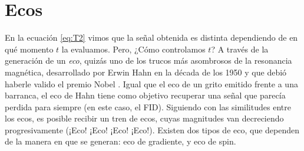 \section{Ecos}
En la ecuación \ref{eq:T2} vimos que la señal obtenida es distinta dependiendo de en qué momento $t$ la evaluamos. Pero, ¿Cómo controlamos $t$? A través de la generación de un \textit{eco}, quizás uno de los trucos más asombrosos de la resonancia magnética, desarrollado por Erwin Hahn en la década de los 1950 y que debió haberle valido el premio Nobel \citep{mansfield2013long}. Igual que el eco de un grito emitido frente a una barranca, el eco de Hahn tiene como objetivo recuperar una señal que parecía perdida para siempre (en este caso, el FID). Siguiendo con las similitudes entre los ecos, es posible recibir un tren de ecos, cuyas magnitudes van decreciendo progresivamente ({\Large ¡Eco!} {\normalsize ¡Eco!} {\small ¡Eco!} {\tiny ¡Eco!}). Existen dos tipos de eco, que dependen de la manera en que se generan: eco de gradiente, y eco de spin.


